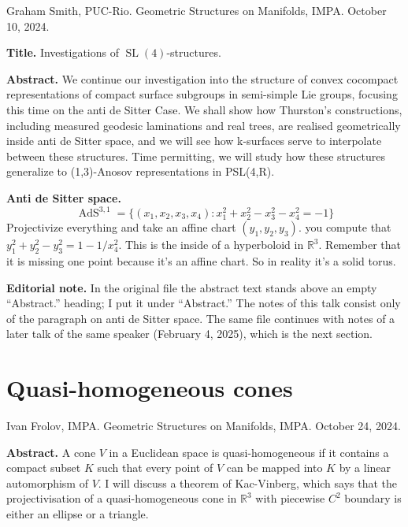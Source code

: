 \noindent
Graham Smith, PUC-Rio. Geometric Structures
on Manifolds, IMPA. October 10, 2024.

\medskip\noindent
{\bf Title.}
Investigations of
$\operatorname{SL}(4)$-structures.

\medskip\noindent
{\bf Abstract.}
We continue our investigation into the
structure of convex cocompact representations
of compact surface subgroups in semi-simple
Lie groups, focusing this time on the anti de
Sitter Case. We shall show how Thurston's
constructions, including measured geodesic
laminations and real trees, are realised
geometrically inside anti de Sitter space,
and we will see how k-surfaces serve to
interpolate between these structures. Time
permitting, we will study how these
structures generalize to (1,3)-Anosov
representations in PSL(4,R).

\medskip\noindent
{\bf Anti de Sitter space.}
$$\operatorname{AdS}^{3,1}=\{(x_1,x_2,x_3,
x_4):x_1^2+x_2^2-x_3^2-x_4^2=-1\}$$
Projectivize everything and take an affine
chart $(y_1,y_2,y_3)$. you compute that
$y_1^2+y_2^2-y_3^2=1-1/x_4^2$. This is the
inside of a hyperboloid in $\mathbb{R}^{3}$.
Remember that it is missing one point because
it's an affine chart. So in reality it's a
solid torus.

\medskip\noindent
{\bf Editorial note.}
In the original file the abstract text stands
above an empty ``Abstract.'' heading; I put
it under ``Abstract.'' The notes of this talk
consist only of the paragraph on anti de
Sitter space. The same file continues with
notes of a later talk of the same speaker
(February 4, 2025), which is the next
section.


\section{Quasi-homogeneous cones}
\label{section-frolov-quasi-hom-cones}

\noindent
Ivan Frolov, IMPA. Geometric Structures on
Manifolds, IMPA. October 24, 2024.

\medskip\noindent
{\bf Abstract.}
A cone $V$ in a Euclidean space is
quasi-homogeneous if it contains a compact
subset $K$ such that every point of $V$ can
be mapped into $K$ by a linear automorphism
of $V$. I will discuss a theorem of
Kac-Vinberg, which says that the
projectivisation of a quasi-homogeneous cone
in $\mathbb{R}^{3}$ with piecewise $C^2$
boundary is either an ellipse or a triangle.

